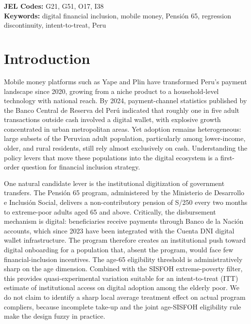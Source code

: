 \documentclass[12pt]{article}
\begin{document}
\textbf{JEL Codes:} G21, G51, O17, I38 \\
\textbf{Keywords:} digital financial inclusion, mobile money, Pensi\'on 65, regression discontinuity, intent-to-treat, Peru

\newpage

\section{Introduction}
\label{sec:introduction}

Mobile money platforms such as Yape and Plin have transformed Peru's payment landscape since 2020, growing from a niche product to a household-level technology with national reach. By 2024, payment-channel statistics published by the Banco Central de Reserva del Per\'u indicated that roughly one in five adult transactions outside cash involved a digital wallet, with explosive growth concentrated in urban metropolitan areas. Yet adoption remains heterogeneous: large subsets of the Peruvian adult population, particularly among lower-income, older, and rural residents, still rely almost exclusively on cash. Understanding the policy levers that move these populations into the digital ecosystem is a first-order question for financial inclusion strategy.

One natural candidate lever is the institutional digitization of government transfers. The Pensi\'on 65 program, administered by the Ministerio de Desarrollo e Inclusi\'on Social, delivers a non-contributory pension of S/250 every two months to extreme-poor adults aged 65 and above. Critically, the disbursement mechanism is digital: beneficiaries receive payments through Banco de la Naci\'on accounts, which since 2023 have been integrated with the Cuenta DNI digital wallet infrastructure. The program therefore creates an institutional push toward digital onboarding for a population that, absent the program, would face few financial-inclusion incentives. The age-65 eligibility threshold is administratively sharp on the age dimension. Combined with the SISFOH extreme-poverty filter, this provides quasi-experimental variation suitable for an intent-to-treat (ITT) estimate of institutional access on digital adoption among the elderly poor. We do not claim to identify a sharp local average treatment effect on actual program compliers, because incomplete take-up and the joint age-SISFOH eligibility rule make the design fuzzy in practice.
\end{document}
